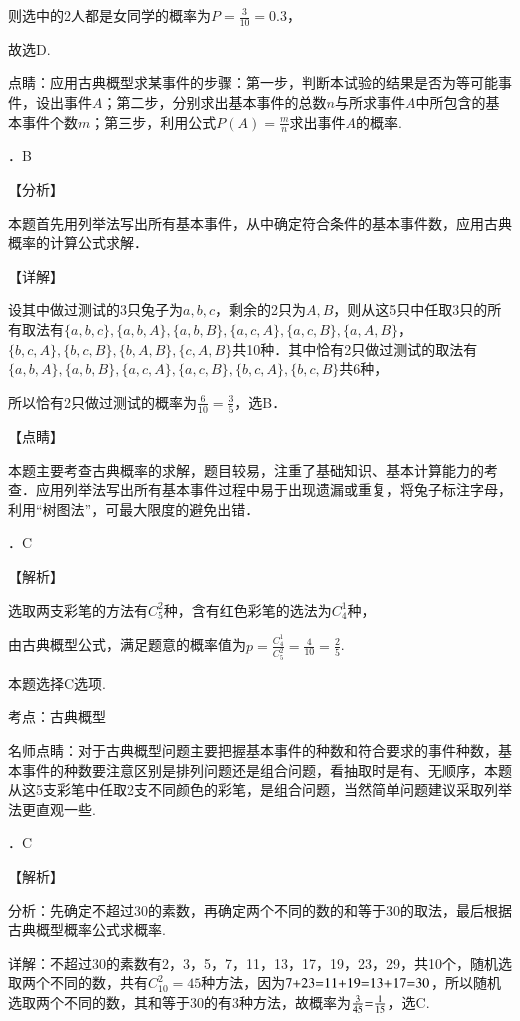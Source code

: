 \documentclass[a4paper,11pt,UTF8,twoside]{ctexart} %
\begin{document}
则选中的2人都是女同学的概率为$P=\frac{3}{10} =0.3$，

故选D.

\noindent 点睛：应用古典概型求某事件的步骤：第一步，判断本试验的结果是否为等可能事件，设出事件$A$；第二步，分别求出基本事件的总数$n$与所求事件$A$中所包含的基本事件个数$m$；第三步，利用公式$P(A)=\frac{m}{n} $求出事件$A$的概率.

．B

\noindent 【分析】

\noindent 本题首先用列举法写出所有基本事件，从中确定符合条件的基本事件数，应用古典概率的计算公式求解．

\noindent 【详解】

\noindent 设其中做过测试的3只兔子为$a,b,c$，剩余的2只为$A,B$，则从这5只中任取3只的所有取法有$\{ a,b,c\} ,\{ a,b,A\} ,\{ a,b,B\} ,\{ a,c,A\} ,\{ a,c,B\} ,\{ a,A,B\} $，$\{ b,c,A\} ,\{ b,c,B\} ,\{ b,A,B\} ,\{ c,A,B\} $共10种．其中恰有2只做过测试的取法有$\{ a,b,A\} ,\{ a,b,B\} ,\{ a,c,A\} ,\{ a,c,B\} ,$$\{ b,c,A\} ,\{ b,c,B\} $共6种，

\noindent 所以恰有2只做过测试的概率为$\frac{6}{10} =\frac{3}{5} $，选B．

\noindent 【点睛】

\noindent 本题主要考查古典概率的求解，题目较易，注重了基础知识、基本计算能力的考查．应用列举法写出所有基本事件过程中易于出现遗漏或重复，将兔子标注字母，利用``树图法''，可最大限度的避免出错．

．C

\noindent 【解析】

\noindent 选取两支彩笔的方法有$C_{5}^{2} $种，含有红色彩笔的选法为$C_{4}^{1} $种，

\noindent 由古典概型公式，满足题意的概率值为$p=\frac{C_{4}^{1} }{C_{5}^{2} } =\frac{4}{10} =\frac{2}{5} $.

\noindent 本题选择C选项.

\noindent 考点：古典概型

\noindent 名师点睛：对于古典概型问题主要把握基本事件的种数和符合要求的事件种数，基本事件的种数要注意区别是排列问题还是组合问题，看抽取时是有、无顺序，本题从这5支彩笔中任取2支不同颜色的彩笔，是组合问题，当然简单问题建议采取列举法更直观一些.

．C

\noindent 【解析】

\noindent 分析：先确定不超过30的素数，再确定两个不同的数的和等于30的取法，最后根据古典概型概率公式求概率.

\noindent 详解：不超过30的素数有2，3，5，7，11，13，17，19，23，29，共10个，随机选取两个不同的数，共有$C_{10}^{2} =45$种方法，因为$7{\rm +}23{\rm =}11{\rm +}19{\rm =}13{\rm +}17{\rm =}30$，所以随机选取两个不同的数，其和等于30的有3种方法，故概率为$\frac{3}{45} {\rm =}\frac{1}{15} $，选C.
\end{document}
